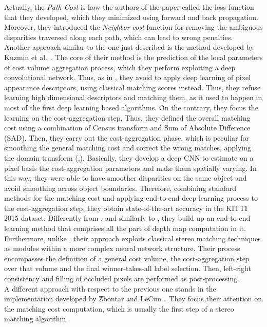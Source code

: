 Actually, the \textit{Path Cost} is how the authors of the paper called the loss function that they developed, which they minimized using forward and back propagation.
Moreover, they introduced the \textit{Neighbor cost} function for removing the ambiguous disparities traversed along each path, which can lead to wrong penalties.\\
Another approach similar to the one just described is the method developed by Kuzmin et al.~\cite{Kuzmin2017}. 
The core of their method is the prediction of the local parameters of cost volume aggregation process, which they perform exploiting a deep convolutional network. 
Thus, as in \cite{Seki2017}, they avoid to apply deep learning of pixel appearance descriptors, using classical matching scores instead. 
Thus, they refuse learning high dimensional descriptors and matching them, as it used to happen in most of the first deep learning based algorithms.
On the contrary, they focus the learning on the cost-aggregation step. 
Thus, they defined the overall matching cost using a combination of Census transform and Sum of Absolute Difference (SAD). 
Then, they carry out the cost-aggregation phase, which is peculiar for smoothing the general matching cost and correct the wrong matches, applying the domain transform (\cite{Gastal2011},\cite{Pham2013}).
Basically, they develop a deep CNN to estimate on a pixel basis the cost-aggregation parameters and make them spatially varying. 
In this way, they were able to have smoother disparities on the same object and avoid smoothing across object boundaries. 
Therefore, combining standard methods for the matching cost and applying end-to-end deep learning process to the cost-aggregation step, they obtain state-of-the-art accuracy in the KITTI 2015 dataset. 
Differently from \cite{Zbontar2016}, \cite{Zbontar2015} and similarly to \cite{Mayer2016}, they build up an end-to-end learning method that comprises all the part of depth map computation in it. 
Furthermore, unlike \cite{Mayer2016}, their approach exploits classical stereo matching techniques as modules within a more complex neural network structure. 
Their process encompasses the definition of a general cost volume, the cost-aggregation step over that volume and the final winner-takes-all label selection. 
Then, left-right consistency and filling of occluded pixels are performed as post-processing.\\
A different approach with respect to the previous one stands in the implementation developed by \^{Z}bontar and LeCun~\cite{Zbontar2016}.
They focus their attention on the matching cost computation, which is usually the first step of a stereo matching algorithm. 
